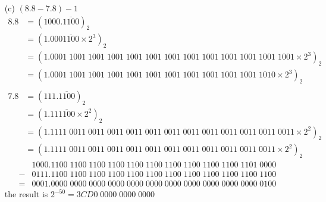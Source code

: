\documentclass[UTF8]{ctexart}
\begin{document}
\begin{enumerate}
\begin{itemize}
\item[(c)] $(8.8 - 7.8) - 1$
\begin{align*}
8.8 &= (1000.\overline{1100})_2 \\
&= (1.000\overline{1100} \times 2^3)_2 \\
&= (1.0001\;1001\;1001\;1001\;1001\;1001\;1001\;1001\;1001\;1001\;1001\;1001\;1001 \times 2^3)_2 \\
&= (1.0001\;1001\;1001\;1001\;1001\;1001\;1001\;1001\;1001\;1001\;1001\;1010 \times 2^3)_2 \\
\end{align*}
\begin{align*}
7.8 &= (111.\overline{1100})_2 \\
&= (1.11\overline{1100} \times 2^2)_2 \\
&= (1.1111\;0011\;0011\;0011\;0011\;0011\;0011\;0011\;0011\;0011\;0011\;0011\;0011 \times 2^2)_2 \\
&= (1.1111\;0011\;0011\;0011\;0011\;0011\;0011\;0011\;0011\;0011\;0011\;0011 \times 2^2)_2
\end{align*}
\begin{align*}
 &1000.1100\;1100\;1100\;1100\;1100\;1100\;1100\;1100\;1100\;1100\;1101\;0000 \\
-&0111.1100\;1100\;1100\;1100\;1100\;1100\;1100\;1100\;1100\;1100\;1100\;1100 \\
\hline
=&0001.0000\;0000\;0000\;0000\;0000\;0000\;0000\;0000\;0000\;0000\;0000\;0100
\end{align*}
the result is $2^{-50} = 3CD0\;0000\;0000\;0000$

\end{itemize}


\end{enumerate}
\end{document}
